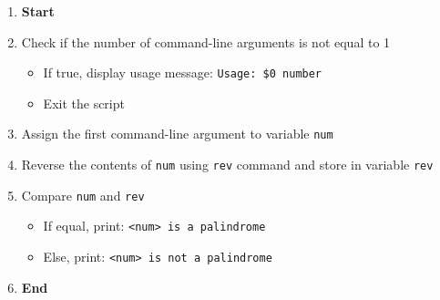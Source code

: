 \begin{enumerate}
    \item \textbf{Start}
    \item Check if the number of command-line arguments is not equal to 1
    \begin{itemize}
        \item If true, display usage message: \texttt{Usage: \$0 number}
        \item Exit the script
    \end{itemize}
    \item Assign the first command-line argument to variable \texttt{num}
    \item Reverse the contents of \texttt{num} using \texttt{rev} command and store in variable \texttt{rev}
    \item Compare \texttt{num} and \texttt{rev}
    \begin{itemize}
        \item If equal, print: \texttt{<num> is a palindrome}
        \item Else, print: \texttt{<num> is not a palindrome}
    \end{itemize}
    \item \textbf{End}
\end{enumerate}

